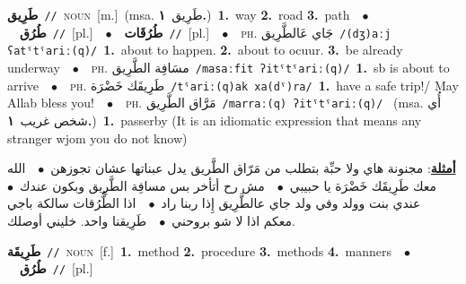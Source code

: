 \documentclass[10pt,a4paper,twoside]{article} %
\begin{document}
\begin{multicols}{2}
{\setlength\topsep{0pt}\textbf{\foreignlanguage{arabic}{طَرِيق}}\ {\color{gray}\texttt{//}\color{black}}\ \textsc{noun}\ [m.]\ \color{gray}(msa. \foreignlanguage{arabic}{طَرِيق}~\foreignlanguage{arabic}{\textbf{١.}})\color{black}\ \textbf{1.}~way  \textbf{2.}~road  \textbf{3.}~path\ \ $\bullet$\ \ \setlength\topsep{0pt}\textbf{\foreignlanguage{arabic}{طُرُق}}\ {\color{gray}\texttt{//}\color{black}}\ [pl.]\ \ $\bullet$\ \ \setlength\topsep{0pt}\textbf{\foreignlanguage{arabic}{طُرُقَات}}\ {\color{gray}\texttt{//}\color{black}}\ [pl.]\ \ $\bullet$\ \ \textsc{ph.} \color{gray} \foreignlanguage{arabic}{جَاي عَالطَّرِيق}\color{black}\ {\color{gray}\texttt{/{\sffamily (dʒ)aːj ʕatˤtˤariː(q)}/}\color{black}}\ \textbf{1.}~about to happen.  \textbf{2.}~about to ocuur.  \textbf{3.}~be already underway\ \ $\bullet$\ \ \textsc{ph.} \color{gray} \foreignlanguage{arabic}{مسَافِة الطَّرِيق}\color{black}\ {\color{gray}\texttt{/{\sffamily masaːfit ʔitˤtˤariː(q)}/}\color{black}}\ \textbf{1.}~sb is about to arrive\ \ $\bullet$\ \ \textsc{ph.} \color{gray} \foreignlanguage{arabic}{طَرِيقَك خَضْرَة}\color{black}\ {\color{gray}\texttt{/{\sffamily tˤariː(q)ak xa(dˤ)ra}/}\color{black}}\ \textbf{1.}~have a safe trip!/ May Allab bless you!\ \ $\bullet$\ \ \textsc{ph.} \color{gray} \foreignlanguage{arabic}{مَرَّاق الطَّرِيق}\color{black}\ {\color{gray}\texttt{/{\sffamily marraː(q) ʔitˤtˤariː(q)}/}\color{black}}\ \color{gray} (msa. \foreignlanguage{arabic}{أُي شخص غريب}~\foreignlanguage{arabic}{\textbf{١.}})\color{black}\ \textbf{1.}~passerby (It is an idiomatic expression that means any stranger wjom you do not know)\  \begin{flushright}\color{gray}\foreignlanguage{arabic}{\textbf{\underline{\foreignlanguage{arabic}{أمثلة}}}: مجنونة هاي ولا حبِّة بتطلب من مَرّاق الطَّريق يدل عبناتها عشان تجوزهن\ $\bullet$\ \  الله معك طَرِيقَك خَضْرَة يا حبيبي\ $\bullet$\ \  مش رح أتأخر بس مسافِة الطَّرِيق وبكون عندك\ $\bullet$\ \  عندي بنت وولد وفي ولد جاي عالطَّرِيق إِذا ربنا راد\ $\bullet$\ \  اذا الطُّرُقات سالكة باجي معكم اذا لا شو بروحني\ $\bullet$\ \  طَرِيقنا واحد. خليني أوصلك.}\end{flushright}\color{black}} \vspace{2mm}

{\setlength\topsep{0pt}\textbf{\foreignlanguage{arabic}{طَرِيقَة}}\ {\color{gray}\texttt{//}\color{black}}\ \textsc{noun}\ [f.]\ \textbf{1.}~method  \textbf{2.}~procedure  \textbf{3.}~methods  \textbf{4.}~manners\ \ $\bullet$\ \ \setlength\topsep{0pt}\textbf{\foreignlanguage{arabic}{طُرُق}}\ {\color{gray}\texttt{//}\color{black}}\ [pl.]\ } \vspace{2mm}


\end{multicols}
\end{document}
